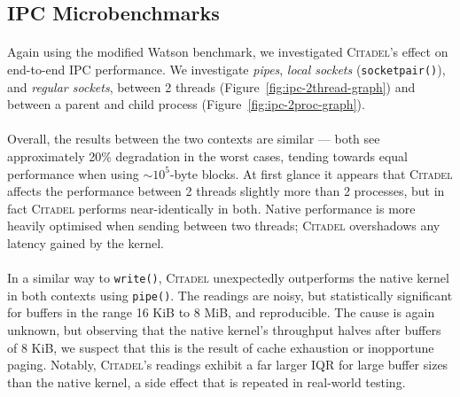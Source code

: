 \subsection{IPC Microbenchmarks}
\label{sec:ipc-microbenchmarks}

\paragraph{} Again using the modified Watson benchmark, we investigated \textsc{Citadel}'s effect on end-to-end IPC performance. We investigate \textit{pipes}, \textit{local sockets} (\texttt{socketpair()}), and \textit{regular sockets}, between 2 threads (Figure~\ref{fig:ipc-2thread-graph}) and between a parent and child process (Figure~\ref{fig:ipc-2proc-graph}).

\paragraph{} Overall, the results between the two contexts are similar --- both see approximately 20\% degradation in the worst cases, tending towards equal performance when using $\sim 10^5$-byte blocks. At first glance it appears that \textsc{Citadel} affects the performance between 2 threads slightly more than 2 processes, but in fact \textsc{Citadel} performs near-identically in both. Native performance is more heavily optimised when sending between two threads; \textsc{Citadel} overshadows any latency gained by the kernel.

\paragraph{} In a similar way to \texttt{write()}, \textsc{Citadel} unexpectedly outperforms the native kernel in both contexts using \texttt{pipe()}. The readings are noisy, but statistically significant for buffers in the range 16 KiB to 8 MiB, and reproducible. The cause is again unknown, but observing that the native kernel's throughput halves after buffers of 8 KiB, we suspect that this is the result of cache exhaustion or inopportune paging. Notably, \textsc{Citadel}'s readings exhibit a far larger IQR for large buffer sizes than the native kernel, a side effect that is repeated in real-world testing.

